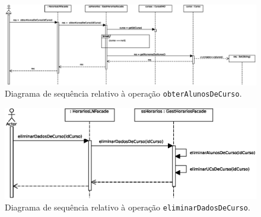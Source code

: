 \documentclass[12pt, a4paper]{article}
\begin{document}
\begin{landscape}
        \vspace*{\fill}
        \pagebreak
        \vspace*{\fill}

        \begin{figure}[H]
            \centering
            \includegraphics[scale=0.75]{Imagens/Modelos/obterAlunosDeCursoDAO.svg.eps}
            \caption{
                Diagrama de sequência relativo à operação \texttt{obterAlunosDeCurso}.
            }
        \end{figure}

        \vspace*{\fill}
        \pagebreak
        \vspace*{\fill}

        \begin{figure}[H]
            \centering
            \includegraphics[scale=1.0]{Imagens/Modelos/eliminarDadosDeCursoDAO.svg.eps}
            \caption{
                Diagrama de sequência relativo à operação \texttt{eliminarDadosDeCurso}.
            }
        \end{figure}

        \vspace*{\fill}
        \pagebreak
        \vspace*{\fill}


\end{landscape}
\end{document}
